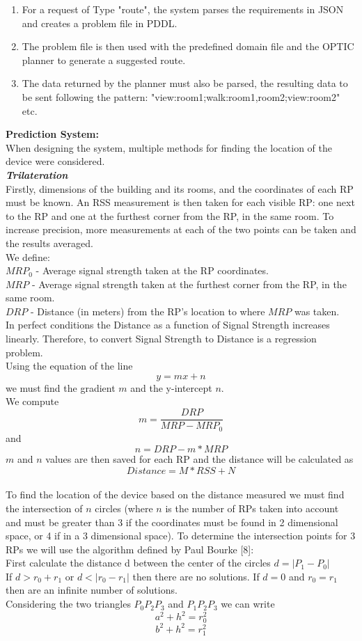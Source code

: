 \begin{enumerate}
\item For a request of Type "route", the system parses the requirements in JSON and creates a problem file in PDDL. 
\item The problem file is then used with the predefined domain file and the OPTIC planner to generate a suggested route.
\item The data returned by the planner must also be parsed, the resulting data to be sent following the pattern:
 "view:room1;walk:room1,room2;view:room2" etc.
\end{enumerate}

\textbf{Prediction System:}
\\
When designing the system, multiple methods for finding the location of the device were considered.
\\
\textit{\textbf{Trilateration}}
\\
Firstly, dimensions of the building and its rooms, and the coordinates of each RP must be known. An RSS measurement is then taken for each visible RP: one next to the RP and one at the furthest corner from the RP, in the same room. To increase precision, more measurements at each of the two points can be taken and the results averaged. \\ 
We define: \\
$MRP_0$ - Average signal strength taken at the RP coordinates. \\
$MRP$ - Average signal strength taken at the furthest corner from the RP, in the same room. \\
$DRP$ - Distance (in meters) from the RP's location to where $MRP$ was taken.\\
In perfect conditions the Distance as a function of Signal Strength increases linearly. Therefore, to convert Signal Strength to Distance is a regression problem.\\
Using the equation of the line $$y = mx + n$$ we must find the gradient $m$ and the y-intercept $n$.\\
We compute $$m = \frac{DRP}{MRP - MRP_0}$$
and $$n  = DRP - m * MRP$$
$m$ and $n$ values are then saved for each RP and the distance will be calculated as $$Distance  = M * RSS + N$$
\\
To find the location of the device based on the distance measured we must find the intersection of $n$ circles (where $n$ is the number of RPs taken into account and must be greater than 3 if the coordinates must be found in 2 dimensional space, or 4 if in a 3 dimensional space).  To determine the intersection points for 3 RPs we will use the algorithm defined by Paul Bourke [8]:\\
First calculate the distance d between the center of the circles $d = |P_1 - P_0|$\\
If $d > r_0 + r_1$ or $d < |r_0 - r_1|$ then there are no solutions. If $d = 0$ and $r_0 = r_1$ then are an infinite number of solutions.\\
Considering the two triangles $P_0P_2P_3$ and $P_1P_2P_3$ we can write $$a^2 + h^2 = r_0^2$$ $$b^2 + h^2 = r_1^2$$

